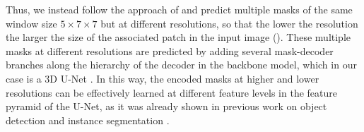 Thus, we instead follow the approach of \cite{Gao_2019_ICCV} and predict multiple \maskname masks of the same window size $5\times 7 \times 7$ but at different resolutions, so that the lower the resolution the larger the size of the associated patch in the input image  (). 
These multiple masks at different resolutions are predicted by adding several mask-decoder branches along the hierarchy of the decoder in the backbone model, which in our case is a 3D U-Net \cite{ronneberger2015u,cciccek20163d}. 
In this way, the encoded \maskname masks at higher and lower resolutions can be effectively learned at different feature levels in the feature pyramid of the U-Net, as it was already shown in previous work on object detection and instance segmentation \cite{Gao_2019_ICCV,lin2017feature}.



